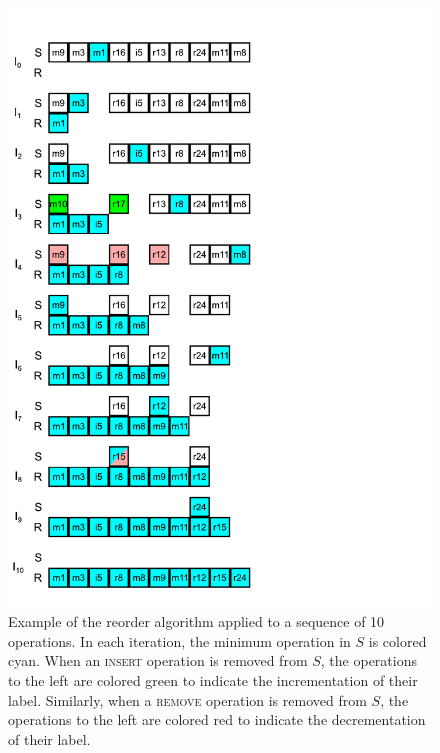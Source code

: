 \begin{figure}[p]
  \includegraphics[width=.9\textwidth]{figures/reorder_example.pdf}

  \caption{\small Example of the reorder algorithm applied to a sequence of 10
  operations. In each iteration, the minimum operation in $S$ is colored cyan.
  When an \textsc{insert} operation is removed from $S$, the operations to the
  left are colored green to indicate the incrementation of their label.
  Similarly, when a \textsc{remove} operation is removed from $S$, the
  operations to the left are colored red to indicate the decrementation of their
  label.}

  \label{fig:reorder-example}
\end{figure}

